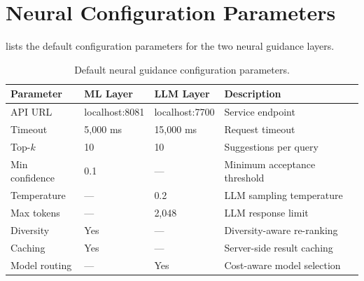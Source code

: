 \documentclass[11pt,a4paper]{article}
\begin{document}
\section{Neural Configuration Parameters}
\label{app:neural-config}

 lists the default configuration parameters for the
two neural guidance layers.

\begin{table}[htbp]
\centering
\caption{Default neural guidance configuration parameters.}
\label{tab:neural-config}
\begin{tabular}{@{}llll@{}}
\toprule
\textbf{Parameter} & \textbf{ML Layer} & \textbf{LLM Layer} & \textbf{Description} \\
\midrule
API URL         & localhost:8081 & localhost:7700 & Service endpoint \\
Timeout         & 5,000 ms      & 15,000 ms      & Request timeout \\
Top-$k$         & 10            & 10             & Suggestions per query \\
Min confidence  & 0.1           & ---            & Minimum acceptance threshold \\
Temperature     & ---           & 0.2            & LLM sampling temperature \\
Max tokens      & ---           & 2,048          & LLM response limit \\
Diversity       & Yes           & ---            & Diversity-aware re-ranking \\
Caching         & Yes           & ---            & Server-side result caching \\
Model routing   & ---           & Yes            & Cost-aware model selection \\
\bottomrule
\end{tabular}
\end{table}
\end{document}

